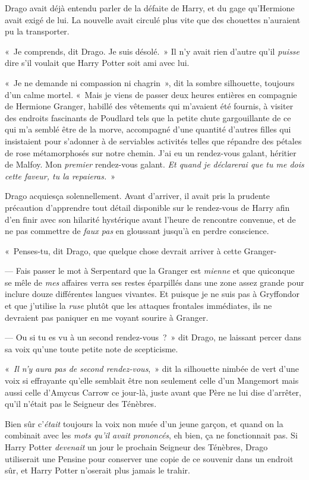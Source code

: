 Drago avait déjà entendu parler de la défaite de Harry, et du gage qu'Hermione avait exigé de lui.
La nouvelle avait circulé plus vite que des chouettes n'auraient pu la transporter.

«~Je comprends, dit Drago.
Je suis désolé.~»
Il n'y avait rien d'autre qu'il \emph{puisse} dire s'il voulait que Harry Potter soit ami avec lui.

«~Je ne demande ni compassion ni chagrin~», dit la sombre silhouette, toujours d'un calme mortel.
«~Mais je viens de passer deux heures entières en compagnie de Hermione Granger, habillé des vêtements qui m'avaient été fournis, à visiter des endroits fascinants de Poudlard tels que la petite chute gargouillante de ce qui m'a semblé être de la morve, accompagné d'une quantité d'autres filles qui insistaient pour s'adonner à de serviables activités telles que répandre des pétales de rose métamorphosés sur notre chemin.
J'ai eu un rendez-vous galant, héritier de Malfoy.
Mon \emph{premier} rendez-vous galant.
\emph{Et quand je déclarerai que tu me dois cette faveur, tu la repaieras.}~»

Drago acquiesça solennellement.
Avant d'arriver, il avait pris la prudente précaution d'apprendre tout détail disponible sur le rendez-vous de Harry afin d'en finir avec son hilarité hystérique avant l'heure de rencontre convenue, et de ne pas commettre de \emph{faux pas} en gloussant jusqu'à en perdre conscience.

«~Penses-tu, dit Drago, que quelque chose devrait arriver à cette Granger-

--- Fais passer le mot à Serpentard que la Granger est \emph{mienne} et que quiconque se mêle de \emph{mes} affaires verra ses restes éparpillés dans une zone assez grande pour inclure douze différentes langues vivantes.
Et puisque je ne suis pas à Gryffondor et que j'utilise la \emph{ruse} plutôt que les attaques frontales immédiates, ils ne devraient pas paniquer en me voyant sourire à Granger.

--- Ou si tu es vu à un second rendez-vous~?~»
dit Drago, ne laissant percer dans sa voix qu'une toute petite note de scepticisme.

«~\emph{Il n'y aura pas de second rendez-vous},~» dit la silhouette nimbée de vert d'une voix si effrayante qu'elle semblait être non seulement celle d'un Mangemort mais aussi celle d'Amycus Carrow ce jour-là, juste avant que Père ne lui dise d'arrêter, qu'il n'était pas le Seigneur des Ténèbres.

Bien sûr c'\emph{était} toujours la voix non muée d'un jeune garçon, et quand on la combinait avec les \emph{mots qu'il avait prononcés}, eh bien, ça ne fonctionnait pas.
Si Harry Potter \emph{devenait} un jour le prochain Seigneur des Ténèbres, Drago utiliserait une Pensine pour conserver une copie de ce souvenir dans un endroit sûr, et Harry Potter n'oserait plus jamais le trahir.

